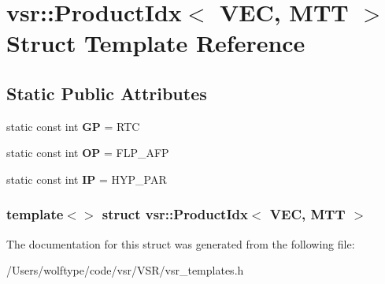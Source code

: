 \hypertarget{structvsr_1_1_product_idx_3_01_v_e_c_00_01_m_t_t_01_4}{\section{vsr\-:\-:Product\-Idx$<$ V\-E\-C, M\-T\-T $>$ Struct Template Reference}
\label{structvsr_1_1_product_idx_3_01_v_e_c_00_01_m_t_t_01_4}
}
\subsection*{Static Public Attributes}
\begin{DoxyCompactItemize}
\item 
\hypertarget{structvsr_1_1_product_idx_3_01_v_e_c_00_01_m_t_t_01_4_a3200e3c10df65f7483e60f0865b17ec2}{static const int {\bfseries G\-P} = R\-T\-C}\label{structvsr_1_1_product_idx_3_01_v_e_c_00_01_m_t_t_01_4_a3200e3c10df65f7483e60f0865b17ec2}

\item 
\hypertarget{structvsr_1_1_product_idx_3_01_v_e_c_00_01_m_t_t_01_4_a523d9e52a36292c46874c6c278340c45}{static const int {\bfseries O\-P} = F\-L\-P\-\_\-\-A\-F\-P}\label{structvsr_1_1_product_idx_3_01_v_e_c_00_01_m_t_t_01_4_a523d9e52a36292c46874c6c278340c45}

\item 
\hypertarget{structvsr_1_1_product_idx_3_01_v_e_c_00_01_m_t_t_01_4_a30cdb70b7218f50c783f0be9263fdf6c}{static const int {\bfseries I\-P} = H\-Y\-P\-\_\-\-P\-A\-R}\label{structvsr_1_1_product_idx_3_01_v_e_c_00_01_m_t_t_01_4_a30cdb70b7218f50c783f0be9263fdf6c}

\end{DoxyCompactItemize}
\subsubsection*{template$<$$>$ struct vsr\-::\-Product\-Idx$<$ V\-E\-C, M\-T\-T $>$}



The documentation for this struct was generated from the following file\-:\begin{DoxyCompactItemize}
\item 
/\-Users/wolftype/code/vsr/\-V\-S\-R/vsr\-\_\-templates.\-h\end{DoxyCompactItemize}
